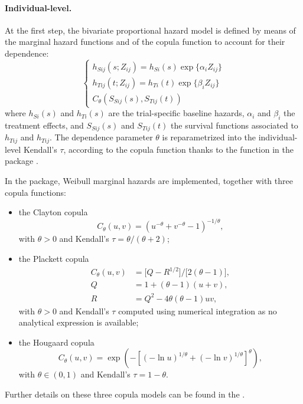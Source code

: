 \documentclass[]{scrartcl}\usepackage[]{graphicx}\usepackage[]{color}
\begin{document}
{{\paragraph{Individual-level.}
At the first step, the bivariate proportional hazard model is defined
  by means of the marginal hazard functions and
  of the copula function to account for their dependence:
  \begin{equation}
    \begin{cases}
      h_{Sij}(s; Z_{ij}) = h_{Si}(s) \exp\big\{
        \alpha_i Z_{ij} 
      \big\}\\
      h_{Tij}(t; Z_{ij}) = h_{Ti}(t) \exp\big\{
        \beta_i Z_{ij}
      \big\}\\
      C_\theta(S_{Sij}(s), S_{Tij}(t))
    \end{cases}
    \label{eq:copulaModel}
  \end{equation}
  where $h_{Si}(s)$ and $h_{Ti}(s)$ are the trial-specific baseline hazards,
  $\alpha_i$ and $\beta_i$ the treatment effects,
  and $S_{Sij}(s)$ and $S_{Tij}(t)$ the survival functions associated to
  $h_{Tij}$ and $h_{Tij}$.
The dependence parameter $\theta$
  is reparametrized into the individual-level Kendall's $\tau$,
  according to the copula function
  thanks to the  function in the 
   package \citep{R:copula, Yan07}.

In the  package,
  Weibull marginal hazards are implemented,
  together with three copula functions:
  \begin{itemize}
    \item the Clayton copula \citep{Clayton78}
      \begin{equation}
        C_\theta(u, v)= \left(u^{-\theta} + v^{-\theta} - 1\right)^{-1/\theta},
        \label{eq:clayton}
      \end{equation}
      with $\theta > 0$
      and Kendall's $\tau = \theta/(\theta+2)$;
    \item the Plackett copula \citep{Plackett65}
      \begin{align}
        C_\theta(u,v) &= \big[ Q - R^{1/2} \big] / \big[2 (\theta - 1) \big],\\
        Q &= 1 +(\theta-1)(u+v), \nonumber\\
        R &= Q^2 - 4 \theta(\theta-1)uv, \nonumber
      \end{align}
      with $\theta > 0$ and Kendall's $\tau$ computed using numerical integration
      as no analytical expression is available;
    \item the Hougaard copula \citep{Hougaard86}
      \begin{equation}
        C_\theta(u,v) = \exp\left(-\left[(- \ln u)^{1/\theta} +
        (- \ln v)^{1/\theta}\right]^\theta \right),
      \end{equation}
      with $\theta \in (0, 1)$ 
      and Kendall's $\tau = 1 - \theta$.
  \end{itemize}
Further details on these three copula models can be found in the 
  .

}}
\end{document}
